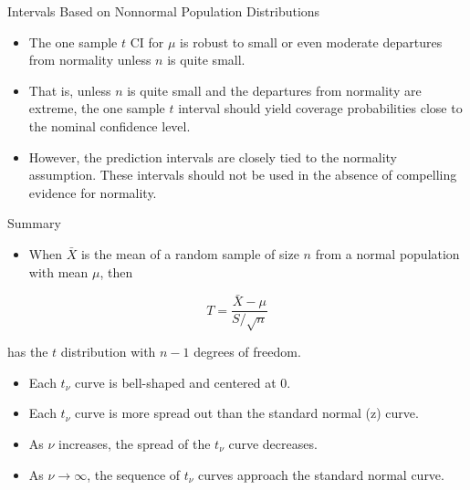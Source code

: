 \documentclass[
  ignorenonframetext,
]{beamer}
\providecommand{\tightlist}{%
  \setlength{\itemsep}{0pt}\setlength{\parskip}{0pt}}\usepackage{longtable,booktabs,array}
\begin{document}
\begin{frame}{Intervals Based on Nonnormal Population Distributions}
\protect\hypertarget{intervals-based-on-nonnormal-population-distributions}{}
\begin{itemize}[<+->]
\tightlist
\item
  The one sample \(t\) CI for \(\mu\) is robust to small or even
  moderate departures from normality unless \(n\) is quite small.
\item
  That is, unless \(n\) is quite small and the departures from normality
  are extreme, the one sample \(t\) interval should yield coverage
  probabilities close to the nominal confidence level.
\item
  However, the prediction intervals are closely tied to the normality
  assumption. These intervals should not be used in the absence of
  compelling evidence for normality.
\end{itemize}
\end{frame}

\begin{frame}{Summary}
\protect\hypertarget{summary-4}{}
\begin{itemize}[<+->]
\tightlist
\item
  When \(\bar{X}\) is the mean of a random sample of size \(n\) from a
  normal population with mean \(\mu\), then
\end{itemize}

\[
T = \frac{\bar{X} - \mu}{S/\sqrt{n}}
\]

has the \(t\) distribution with \(n-1\) degrees of freedom.

\begin{itemize}[<+->]
\tightlist
\item
  Each \(t_{\nu}\) curve is bell-shaped and centered at 0.
\item
  Each \(t_{\nu}\) curve is more spread out than the standard normal (z)
  curve.
\item
  As \(\nu\) increases, the spread of the \(t_{\nu}\) curve decreases.
\item
  As \(\nu \rightarrow \infty\), the sequence of \(t_{\nu}\) curves
  approach the standard normal curve.
\end{itemize}
\end{frame}
\end{document}
